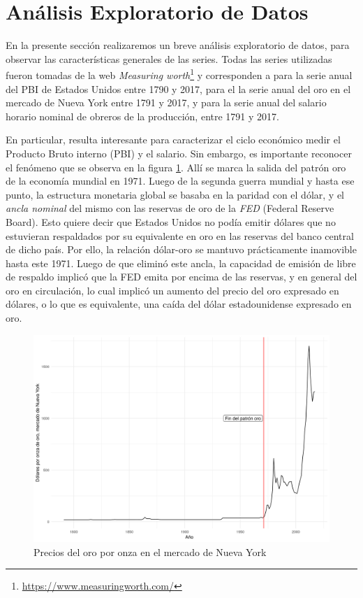 \documentclass[a4paper]{article}
\begin{document}
\section{Análisis Exploratorio de Datos}

En la presente sección realizaremos un breve análisis exploratorio de datos, para observar las características generales de las series.
Todas las series utilizadas fueron tomadas de la web \textit{Measuring worth}\footnote{\url{https://www.measuringworth.com/}} y corresponden a \cite{officer2018gdp} para la serie anual del PBI de Estados Unidos entre 1790 y 2017, \cite{officer2018gold} para el la serie anual del oro en el mercado de Nueva York entre 1791 y 2017, y \cite{officer2018wage} para la serie anual del salario horario nominal de obreros de la producción, entre 1791 y 2017.
 
En particular, resulta interesante para caracterizar el ciclo económico medir el Producto Bruto interno (PBI) y el salario. Sin embargo, es importante reconocer el fenómeno que se observa en la figura \ref{fig:oro}. Allí se marca la salida del patrón oro de la economía mundial en 1971. Luego de la segunda guerra mundial y hasta ese punto, la estructura monetaria global se basaba en la paridad con el dólar, y el \textit{ancla nominal} del mismo con las reservas de oro de la \textit{FED} (Federal Reserve Board). Esto quiere decir que Estados Unidos no podía emitir dólares que no estuvieran respaldados por su equivalente en oro en las reservas del banco central de dicho país. Por ello, la relación dólar-oro se mantuvo prácticamente inamovible hasta este 1971. Luego de que eliminó este ancla, la capacidad de emisión de libre de respaldo implicó que la FED emita por encima de las reservas, y en general del oro en circulación, lo cual implicó un aumento del precio del oro expresado en dólares, o lo que es equivalente, una caída del dólar estadounidense expresado en oro.

\begin{figure}[H]
	\centering
	\includegraphics[width=0.8\linewidth]{oro.png}
	\caption{Precios del oro por onza en el mercado de Nueva York} \label{fig:oro}
\end{figure}
\end{document}

